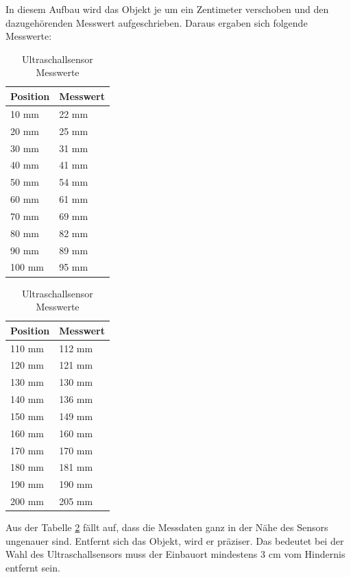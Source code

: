 In diesem Aufbau wird das Objekt je um ein Zentimeter verschoben und den dazugehörenden Messwert aufgeschrieben. Daraus ergaben sich folgende Messwerte:
\begin{table}[H]
\centering
\begin{minipage}{0.45\textwidth}
\centering
\begin{tabular}{@{}ll@{}}
\toprule
\textbf{Position} & \textbf{Messwert} \\
\midrule
10 mm  & 22 mm  \\
20 mm  & 25 mm  \\
30 mm  & 31 mm  \\
40 mm  & 41 mm  \\
50 mm  & 54 mm  \\
60 mm  & 61 mm  \\
70 mm  & 69 mm  \\
80 mm  & 82 mm  \\
90 mm  & 89 mm  \\
100 mm & 95 mm  \\
\bottomrule
\end{tabular}
\end{minipage}%
\hspace{0.05\textwidth} %
\begin{minipage}{0.45\textwidth}
\centering
\begin{tabular}{@{}ll@{}}
\toprule
\textbf{Position} & \textbf{Messwert} \\
\midrule
110 mm & 112 mm \\
120 mm & 121 mm \\
130 mm & 130 mm \\
140 mm & 136 mm \\
150 mm & 149 mm \\
160 mm & 160 mm \\
170 mm & 170 mm \\
180 mm & 181 mm \\
190 mm & 190 mm \\
200 mm & 205 mm \\
\bottomrule
\end{tabular}
\end{minipage}
\caption{Ultraschallsensor Messwerte}
\label{tab:UltraschallMD}
\end{table}

Aus der Tabelle \ref{tab:UltraschallMD} fällt auf, dass die Messdaten ganz in der Nähe des Sensors ungenauer sind. Entfernt sich das Objekt, wird er präziser. Das bedeutet bei der Wahl des Ultraschallsensors muss der Einbauort mindestens 3 cm vom Hindernis entfernt sein. 

